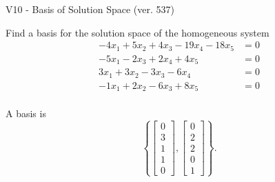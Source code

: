 \begin{exercise}
  \begin{exerciseTitle}V10 - Basis of Solution Space (ver. 537)\end{exerciseTitle}
  \begin{exerciseStatement}
    Find a basis for the solution space of the homogeneous system 
\begin{align*}
 -4 x_ 1 + 5 x_ 2 + 4 x_ 3 -19 x_ 4 -18 x_ 5 &= 0  \\ 
  -5 x_ 1 -2 x_ 3 + 2 x_ 4 + 4 x_ 5 &= 0  \\ 
  3 x_ 1 + 3 x_ 2 -3 x_ 3 -6 x_ 4 &= 0  \\ 
  -1 x_ 1 + 2 x_ 2 -6 x_ 3 + 8 x_ 5 &= 0  \\ 
 \end{align*}


 
  \end{exerciseStatement}

  \begin{exerciseAnswer}
   A basis is   
\[\left\{\left[\begin{array}{c}
0 \\
3 \\
1 \\
1 \\
0
\end{array}\right] , \left[\begin{array}{c}
0 \\
2 \\
2 \\
0 \\
1
\end{array}\right]\right\}.\]

  


  \end{exerciseAnswer}
\end{exercise}